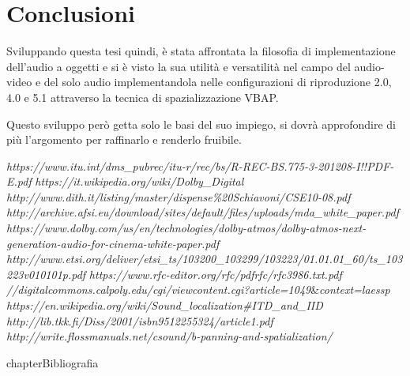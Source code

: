 \documentclass[12pt,a4paper]{report}
\begin{document}
\chapter*{Conclusioni}

Sviluppando questa tesi quindi, è stata affrontata la filosofia di implementazione dell'audio a oggetti e si è visto la sua utilità e versatilità nel campo del audio-video e del solo audio implementandola nelle configurazioni di riproduzione 2.0, 4.0 e 5.1 attraverso la tecnica di spazializzazione VBAP.

Questo sviluppo però getta solo le basi del suo impiego, si dovrà approfondire di più l'argomento per raffinarlo e renderlo fruibile.





\begin{thebibliography}{}

 \textit{https://www.itu.int/dms\_pubrec/itu-r/rec/bs/R-REC-BS.775-3-201208-I!!PDF-E.pdf}
 \textit{https://it.wikipedia.org/wiki/Dolby\_Digital}
 \textit{http://www.dith.it/listing/master/dispense\%20Schiavoni/CSE10-08.pdf}
 \textit{http://archive.afsi.eu/download/sites/default/files/uploads/mda\_white\_paper.pdf}
 \textit{https://www.dolby.com/us/en/technologies/dolby-atmos/dolby-atmos-next-generation-audio-for-cinema-white-paper.pdf}
\textit{http://www.etsi.org/deliver/etsi\_ts/103200\_103299/103223/01.01.01\_60/ts\_103223v010101p.pdf}
 \textit{https://www.rfc-editor.org/rfc/pdfrfc/rfc3986.txt.pdf}
\textit{//digitalcommons.calpoly.edu/cgi/viewcontent.cgi?article=1049}\&\textit{context=laessp}
 \textit{https://en.wikipedia.org/wiki/Sound\_localization\#ITD\_and\_IID}
 \textit{http://lib.tkk.fi/Diss/2001/isbn9512255324/article1.pdf}
 \textit{http://write.flossmanuals.net/csound/b-panning-and-spatialization/}
\end{thebibliography}

 {chapter}{Bibliografia}
\end{document}
